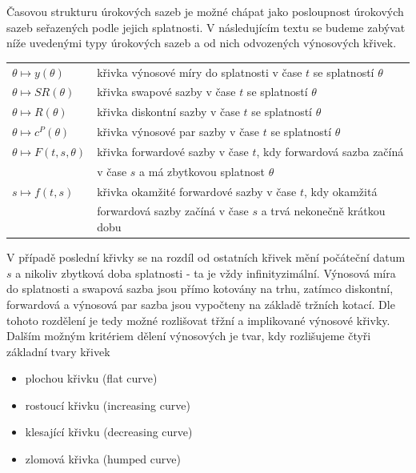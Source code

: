 \documentclass[a4paper]{book}
\begin{document}
Časovou strukturu úrokových sazeb je možné chápat jako posloupnost úrokových sazeb seřazených podle jejich splatnosti. V následujícím textu se budeme zabývat níže uvedenými typy úrokových sazeb a od nich odvozených výnosových křivek.
\begin{center}
\begin{tabular}{l l}
$\theta \longmapsto y(\theta)$ & křivka výnosové míry do splatnosti v čase $t$ se splatností $\theta$\\
$\theta \longmapsto SR(\theta)$ & křivka swapové sazby v čase $t$ se splatností $\theta$\\
$\theta \longmapsto R(\theta)$ & křivka diskontní sazby v čase $t$ se splatností $\theta$\\
$\theta \longmapsto c^P(\theta)$ & křivka výnosové par sazby v čase $t$ se splatností $\theta$\\
$\theta \longmapsto F(t,s,\theta)$ & křivka forwardové sazby v čase $t$, kdy forwardová sazba začíná\\
 & v čase $s$ a má zbytkovou splatnost $\theta$\\
$s \longmapsto f(t,s)$ & křivka okamžité forwardové sazby v čase $t$, kdy okamžitá\\
 & forwardová sazby začíná v čase $s$ a trvá nekonečně krátkou dobu\\
\end{tabular}
\end{center}
V případě poslední křivky se na rozdíl od ostatních křivek mění počáteční datum $s$ a nikoliv zbytková doba splatnosti - ta je vždy infinityzimální. Výnosová míra do splatnosti a swapová sazba jsou přímo kotovány na trhu, zatímco diskontní, forwardová a výnosová par sazba jsou vypočteny na základě tržních kotací. Dle tohoto rozdělení je tedy možné rozlišovat třžní a implikované výnosové křivky. Dalším možným kritériem dělení výnosových je tvar, kdy rozlišujeme čtyři základní tvary křivek
\begin{itemize}
\item plochou křivku (flat curve)
\item rostoucí křivku (increasing curve)
\item klesající křivku (decreasing curve)
\item zlomová křivka (humped curve)
\end{itemize}
\end{document}
